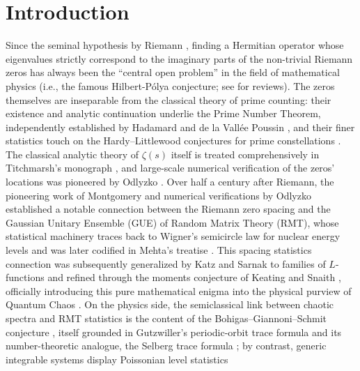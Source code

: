 \documentclass[fractalfract,article,submit,oneauthor,pdftex]{Definitions/mdpi}
\begin{document}
\maketitle

\section{Introduction}

Since the seminal hypothesis by Riemann \cite{riemann1859}, finding a Hermitian
operator whose eigenvalues strictly correspond to the imaginary parts of
the non-trivial Riemann zeros has always been the ``central open problem'' in the
field of mathematical physics (i.e., the famous Hilbert-P\'olya
conjecture; see \cite{katzsarnak1999,schumayer2011,conrey2003} for reviews).
The zeros themselves are inseparable from the classical theory of prime
counting: their existence and analytic continuation underlie the Prime
Number Theorem, independently established by Hadamard \cite{hadamard1896} and
de la Vall\'ee Poussin \cite{delavallee1896}, and their finer statistics touch
on the Hardy--Littlewood conjectures for prime constellations
\cite{hardylittlewood1923}. The classical analytic theory of \(\zeta(s)\)
itself is treated comprehensively in Titchmarsh's monograph
\cite{titchmarsh1951}, and large-scale numerical verification of the
zeros' locations was pioneered by Odlyzko \cite{odlyzko1989}. Over half a
century after Riemann, the pioneering work of
Montgomery \cite{montgomery1973} and numerical verifications by Odlyzko \cite{odlyzko1987}
established a notable connection between the Riemann zero spacing and
the Gaussian Unitary Ensemble (GUE) of Random Matrix Theory (RMT), whose
statistical machinery traces back to Wigner's semicircle law for nuclear
energy levels \cite{wigner1955} and was later codified in Mehta's
treatise \cite{mehta2004}. This spacing statistics connection was
subsequently generalized by Katz and Sarnak to families of \(L\)-functions
\cite{katzsarnak1999,rudnicksarnak1996} and refined through the moments
conjecture of Keating and Snaith \cite{keatingsnaith2000}, officially introducing
this pure mathematical enigma into the physical purview of Quantum Chaos
\cite{berry1986}. On the physics side, the semiclassical link between
chaotic spectra and RMT statistics is the content of the
Bohigas--Giannoni--Schmit conjecture \cite{bohigas1984}, itself grounded in
Gutzwiller's periodic-orbit trace formula \cite{gutzwiller1971} and its
number-theoretic analogue, the Selberg trace formula \cite{selberg1956}; by
contrast, generic integrable systems display Poissonian level statistics
\end{document}
